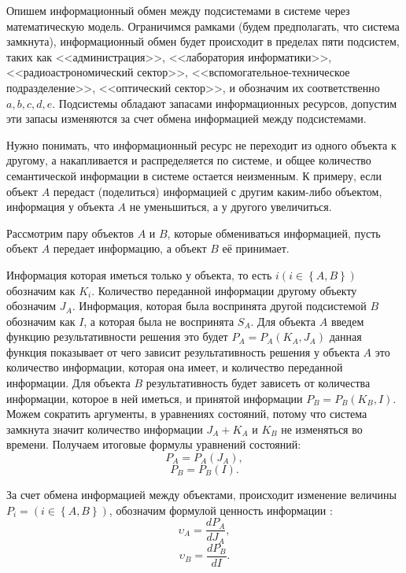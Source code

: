 Опишем информационный обмен между подсистемами в системе через математическую модель. Ограничимся рамками (будем предполагать, что система замкнута), информационный обмен будет  происходит в пределах пяти подсистем, таких как <<администрация>>, <<лаборатория информатики>>, <<радиоастрономический сектор>>, <<вспомогательное-техническое подразделение>>, <<оптический сектор>>, и обозначим их соответственно $a, b, c, d, e$. Подсистемы обладают запасами информационных ресурсов, допустим эти запасы изменяются за счет обмена информацией между подсистемами. 

Нужно понимать, что информационный ресурс не переходит из одного объекта к другому, а накапливается и распределяется по системе, и общее количество семантической информации в системе остается неизменным. К примеру, если объект $A$ передаст (поделиться) информацией с другим каким-либо объектом, информация у объекта $A$ не уменьшиться, а у другого увеличиться.

Рассмотрим пару объектов $A$ и $B$, которые обмениваться информацией, пусть объект $A$ передает информацию, а объект $B$ её принимает.

Информация которая иметься только у объекта, то есть  $i \left( i \in \left\{A,B \right\} \right)$ обозначим как $K_i$. Количество переданной информации другому объекту обозначим $J_A$. Информация, которая была воспринята другой подсистемой $B$ обозначим как $I$, а которая была не воспринята $S_A$. Для объекта $A$ введем функцию результативности решения это будет $P_A=P_A(K_A,J_A)$ данная функция показывает от чего зависит результативность решения у объекта $A$ 	это количество информации, которая она имеет, и количество переданной информации. Для объекта $B$ результативность будет зависеть от количества информации, которое в ней иметься, и принятой информации $P_B=P_B(K_B,I)$. 
Можем сократить аргументы, в уравнениях состояний, потому что система замкнута значит количество информации $J_A+K_A$ и $K_B$ не изменяться во времени. Получаем итоговые формулы уравнений состояний:
\begin{equation}\label{eq:sost1}
P_A=P_A(J_A),
\end{equation}
\begin{equation}\label{eq:sost2}
P_B=P_B(I). 
\end{equation}

За счет обмена информацией между объектами, происходит изменение величины $P_i = \left( i \in \left\{A,B \right\} \right)$, обозначим формулой ценность информации :
\begin{equation}\label{eq:cenoostinfo1}
\upsilon_A = \frac{dP_A}{dJ_A},
\end{equation}
\begin{equation}\label{eq:cenoostinfo2}
\upsilon_B = \frac{dP_B	}{dI}.
\end{equation}

